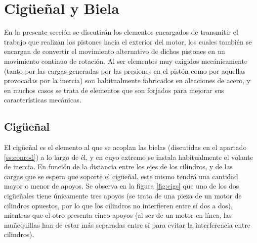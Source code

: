 \newpage

\section{Cigüeñal y Biela} \label{s:secion_04}

En la presente sección se discutirán los elementos encargados de transmitir el trabajo que realizan los pistones hacia el exterior del motor, los cuales también se encargan de convertir el movimiento alternativo de dichos pistones en un movimiento continuo de rotación. Al ser elementos muy exigidos mecánicamente (tanto por las cargas generadas por las presiones en el pistón como por aquellas provocadas por la inercia) son habitualmente fabricados en aleaciones de acero, y en muchos casos se trata de elementos que son forjados para mejorar sus características mecánicas.

\subsection{Cigüeñal} \label{ss:crankshaft}

El cigüeñal es el elemento al que se acoplan las bielas (discutidas en el apartado \ref{ss:conrod}) a lo largo de él, y en cuyo extremo se instala habitualmente el volante de inercia. En función de la distancia entre los ejes de los cilindros, y de las cargas que se espera que soporte el cigüeñal, este mismo tendrá una cantidad mayor o menor de apoyos. Se observa en la figura \ref{fig:cigs} que uno de los dos cigüeñales tiene únicamente tres apoyos (se trata de una pieza de un motor de cilindros opuestos, por lo que los cilindros no interfieren entre sí dos a dos), mientras que el otro presenta cinco apoyos (al ser de un motor en línea, las muñequillas han de estar más separadas entre sí para evitar la interferencia entre cilindros).

